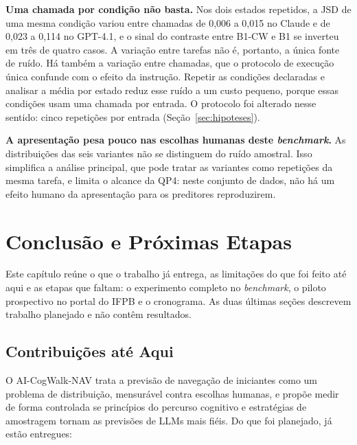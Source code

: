 \documentclass[12pt,oneside,a4paper,chapter=TITLE,english,brazil]{abntex2}
\newcommand{\proj}{AI-CogWalk-NAV}
\begin{document}
\textbf{Uma chamada por condição não basta.} Nos dois estados repetidos, a JSD de uma mesma condição variou entre chamadas de 0,006 a 0,015 no Claude e de 0,023 a 0,114 no GPT-4.1, e o sinal do contraste entre B1-CW e B1 se inverteu em três de quatro casos. A variação entre tarefas não é, portanto, a única fonte de ruído. Há também a variação entre chamadas, que o protocolo de execução única confunde com o efeito da instrução. Repetir as condições declaradas e analisar a média por estado reduz esse ruído a um custo pequeno, porque essas condições usam uma chamada por entrada. O protocolo foi alterado nesse sentido: cinco repetições por entrada (Seção~\ref{sec:hipoteses}).

\textbf{A apresentação pesa pouco nas escolhas humanas deste \textit{benchmark}.} As distribuições das seis variantes não se distinguem do ruído amostral. Isso simplifica a análise principal, que pode tratar as variantes como repetições da mesma tarefa, e limita o alcance da QP4: neste conjunto de dados, não há um efeito humano da apresentação para os preditores reproduzirem.

\chapter{Conclusão e Próximas Etapas}
\label{cap:conclusao}

Este capítulo reúne o que o trabalho já entrega, as limitações do que foi feito até aqui e as etapas que faltam: o experimento completo no \textit{benchmark}, o piloto prospectivo no portal do IFPB e o cronograma. As duas últimas seções descrevem trabalho planejado e não contêm resultados.

\section{Contribuições até Aqui}

O \proj{} trata a previsão de navegação de iniciantes como um problema de distribuição, mensurável contra escolhas humanas, e propõe medir de forma controlada se princípios do percurso cognitivo e estratégias de amostragem tornam as previsões de LLMs mais fiéis. Do que foi planejado, já estão entregues:
\end{document}
